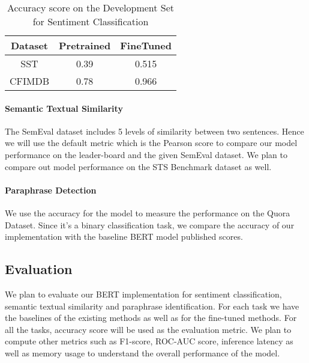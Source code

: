 \documentclass{article}
\begin{document}
\begin{table}[htbp]
    \centering
    \begin{tabular}{|c|c|c|}
        \hline
        Dataset & Pretrained & FineTuned \\ \hline
         SST    &   0.39  & 0.515 \\   
         CFIMDB &   0.78  & 0.966 \\ 
         \hline 
    \end{tabular}
    \caption{Accuracy score on the Development Set  for Sentiment Classification}
    \label{baseline_SA}
\end{table}
\vspace{-2em}

\paragraph{Semantic Textual Similarity}
The SemEval dataset includes 5 levels of similarity between two sentences. Hence we will use the default metric which is the Pearson score to compare our model performance on the leader-board and the given SemEval dataset. We plan to compare out model performance on the STS Benchmark dataset as well.

\paragraph{Paraphrase Detection}
We use the accuracy for the model to measure the performance on the Quora Dataset. Since it's a binary classification task, we compare the accuracy of our implementation with the baseline BERT model published scores.

\subsection{Evaluation}

We plan to evaluate our  BERT implementation for sentiment classification, semantic textual similarity and paraphrase identification. For each task we have the baselines of the existing methods as well as for the fine-tuned methods. For all the tasks, accuracy score will be used as the evaluation metric. We plan to compute other metrics such as F1-score, ROC-AUC score, inference latency as well as memory usage to understand the overall performance of the model. 
\end{document}
